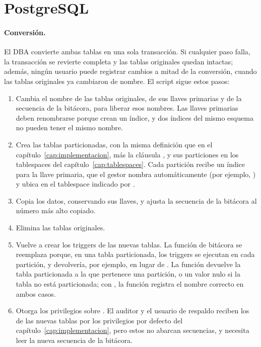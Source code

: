 
\section{PostgreSQL}

\paragraph{Conversión.} El DBA convierte ambas tablas en una sola transacción. Si cualquier paso falla, la transacción se revierte completa y las tablas originales quedan intactas; además, ningún usuario puede registrar cambios a mitad de la conversión, cuando las tablas originales ya cambiaron de nombre. El script sigue estos pasos:

\begin{enumerate}[leftmargin=*]
	\item Cambia el nombre de las tablas originales, de sus llaves primarias y de la secuencia de la bitácora, para liberar esos nombres. Las llaves primarias deben renombrarse porque crean un índice, y dos índices del mismo esquema no pueden tener el mismo nombre.
	\item Crea las tablas particionadas, con la misma definición que en el capítulo~\ref{cap:implementacion}, más la cláusula , y sus particiones en los tablespaces del capítulo~\ref{cap:tablespaces}. Cada partición recibe un índice para la llave primaria, que el gestor nombra automáticamente (por ejemplo, ) y ubica en el tablespace indicado por .
	\item Copia los datos, conservando sus llaves, y ajusta la secuencia de la bitácora al número más alto copiado.
	\item Elimina las tablas originales.
	\item Vuelve a crear los triggers de las nuevas tablas. La función de bitácora se reemplaza porque, en una tabla particionada, los triggers se ejecutan en cada partición, y  devolvería, por ejemplo,  en lugar de . La función  devuelve la tabla particionada a la que pertenece una partición, o un valor nulo si la tabla no está particionada; con , la función registra el nombre correcto en ambos casos.
	\item Otorga los privilegios sobre . El auditor y el usuario de respaldo reciben los de las nuevas tablas por los privilegios por defecto del capítulo~\ref{cap:implementacion}, pero estos no abarcan secuencias, y  necesita leer la nueva secuencia de la bitácora.
\end{enumerate}

